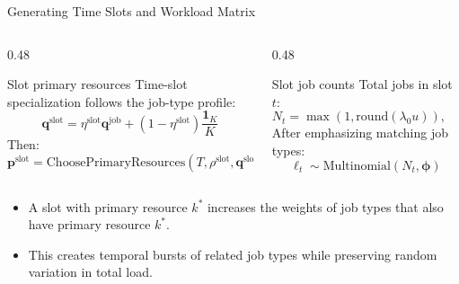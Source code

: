 \documentclass[aspectratio=169,10pt]{beamer}
\begin{document}
\begin{frame}{Generating Time Slots and Workload Matrix}
  \begin{columns}[T,totalwidth=\textwidth]
    \begin{column}{0.48\textwidth}
      \begin{block}{Slot primary resources}
        Time-slot specialization follows the job-type profile:
        \[
          \mathbf{q}^{\mathrm{slot}}
          =
          \eta^{\mathrm{slot}}\mathbf{q}^{\mathrm{job}}
          +(1-\eta^{\mathrm{slot}})\frac{\mathbf{1}_K}{K}
        \]
        Then:
        \[
          \mathbf{p}^{\mathrm{slot}}
          =
          \mathrm{ChoosePrimaryResources}(T,\rho^{\mathrm{slot}},\mathbf{q}^{\mathrm{slot}})
        \]
      \end{block}
    \end{column}
    \begin{column}{0.48\textwidth}
      \begin{block}{Slot job counts}
        Total jobs in slot $t$:
        \[
          N_t=\max(1,\mathrm{round}(\lambda_0 u)),
          \qquad
          u\sim U([\lambda_{\min},\lambda_{\max}))
        \]
        After emphasizing matching job types:
        \[
          \boldsymbol{\ell}_t
          \sim
          \mathrm{Multinomial}(N_t,\boldsymbol{\phi})
        \]
      \end{block}
    \end{column}
  \end{columns}
  \vspace{0.15cm}
  \begin{itemize}
    \item A slot with primary resource $k^*$ increases the weights of job types that also have primary resource $k^*$.
    \item This creates temporal bursts of related job types while preserving random variation in total load.
  \end{itemize}
\end{frame}
\end{document}
